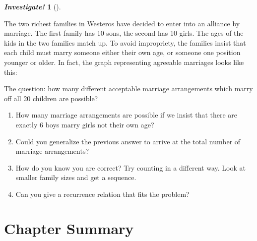 \documentclass[10pt,]{book}
\theoremstyle{plain}
\theoremstyle{definition}
\theoremstyle{definition}
\newtheorem{investigation}[project]{\emph{Investigate!}}
\theoremstyle{definition}
\numberwithin{equation}{chapter}
\newcommand{\vtx}[2]{node[fill,circle,inner sep=0pt, minimum size=4pt,label=#1:#2]{}}
\renewcommand{\v}{\vtx{above}{}}
\begin{document}
\begin{investigation}[]\label{investigation-37}

The two richest families in Westeros have decided to enter into an alliance by marriage. The first family has 10 sons, the second has 10 girls. The ages of the kids in the two families match up. To avoid impropriety, the families insist that each child must marry someone either their own age, or someone one position younger or older. In fact, the graph representing agreeable marriages looks like this:
%
\leavevmode%
\begin{figure}
\centering
{
}
\end{figure}
\par

The question: how many different acceptable marriage arrangements which marry off all 20 children are possible?
\leavevmode%
\begin{enumerate}
\item\hypertarget{li-1233}{}
How many marriage arrangements are possible if we insist that there are exactly 6 boys marry girls not their own age?
%
\item\hypertarget{li-1234}{}
Could you generalize the previous answer to arrive at the total number of marriage arrangements?
%
\item\hypertarget{li-1235}{}
How do you know you are correct? Try counting in a different way. Look at smaller family sizes and get a sequence.
%
\item\hypertarget{li-1236}{}
Can you give a recurrence relation that fits the problem?
%
\end{enumerate}
%
\end{investigation}
\typeout{************************************************}
\typeout{************************************************}
\section[Chapter Summary]{Chapter Summary}\label{sec_gt-conc}
\typeout{************************************************}
\typeout{************************************************}
\end{document}
